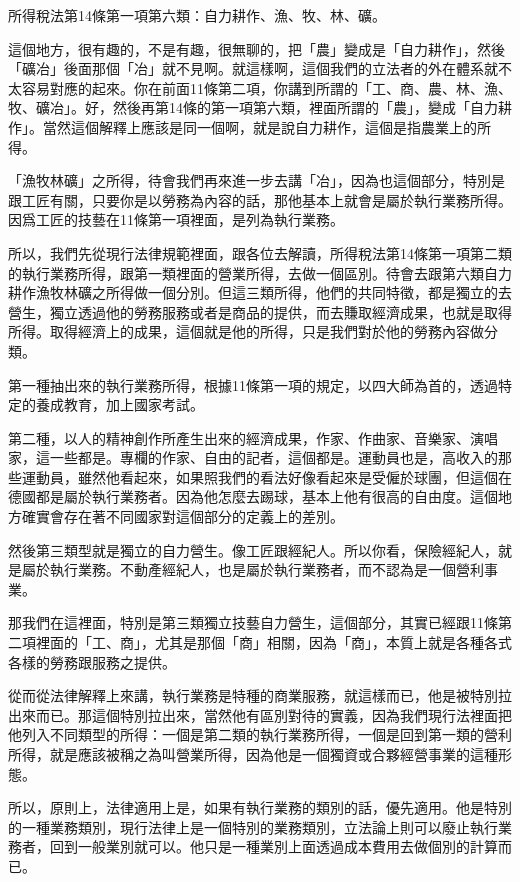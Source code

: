 \documentclass[oneside,sub3section]{ctexbook}
\begin{document}
所得稅法第14條第一項第六類：自力耕作、漁、牧、林、礦。

這個地方，很有趣的，不是有趣，很無聊的，把「農」變成是「自力耕作」，然後「礦冶」後面那個「冶」就不見啊。就這樣啊，這個我們的立法者的外在體系就不太容易對應的起來。你在前面11條第二項，你講到所謂的「工、商、農、林、漁、牧、礦冶」。好，然後再第14條的第一項第六類，裡面所謂的「農」，變成「自力耕作」。當然這個解釋上應該是同一個啊，就是說自力耕作，這個是指農業上的所得。

「漁牧林礦」之所得，待會我們再來進一步去講「冶」，因為也這個部分，特別是跟工匠有關，只要你是以勞務為內容的話，那他基本上就會是屬於執行業務所得。因爲工匠的技藝在11條第一項裡面，是列為執行業務。

所以，我們先從現行法律規範裡面，跟各位去解讀，所得稅法第14條第一項第二類的執行業務所得，跟第一類裡面的營業所得，去做一個區別。待會去跟第六類自力耕作漁牧林礦之所得做一個分別。但這三類所得，他們的共同特徵，都是獨立的去營生，獨立透過他的勞務服務或者是商品的提供，而去賺取經濟成果，也就是取得所得。取得經濟上的成果，這個就是他的所得，只是我們對於他的勞務內容做分類。

第一種抽出來的執行業務所得，根據11條第一項的規定，以四大師為首的，透過特定的養成教育，加上國家考試。

第二種，以人的精神創作所產生出來的經濟成果，作家、作曲家、音樂家、演唱家，這一些都是。專欄的作家、自由的記者，這個都是。運動員也是，高收入的那些運動員，雖然他看起來，如果照我們的看法好像看起來是受僱於球團，但這個在德國都是屬於執行業務者。因為他怎麼去踢球，基本上他有很高的自由度。這個地方確實會存在著不同國家對這個部分的定義上的差別。

然後第三類型就是獨立的自力營生。像工匠跟經紀人。所以你看，保險經紀人，就是屬於執行業務。不動產經紀人，也是屬於執行業務者，而不認為是一個營利事業。

那我們在這裡面，特別是第三類獨立技藝自力營生，這個部分，其實已經跟11條第二項裡面的「工、商」，尤其是那個「商」相關，因為「商」，本質上就是各種各式各樣的勞務跟服務之提供。

從而從法律解釋上來講，執行業務是特種的商業服務，就這樣而已，他是被特別拉出來而已。那這個特別拉出來，當然他有區別對待的實義，因為我們現行法裡面把他列入不同類型的所得：一個是第二類的執行業務所得，一個是回到第一類的營利所得，就是應該被稱之為叫營業所得，因為他是一個獨資或合夥經營事業的這種形態。

所以，原則上，法律適用上是，如果有執行業務的類別的話，優先適用。他是特別的一種業務類別，現行法律上是一個特別的業務類別，立法論上則可以廢止執行業務者，回到一般業別就可以。他只是一種業別上面透過成本費用去做個別的計算而已。
\end{document}
